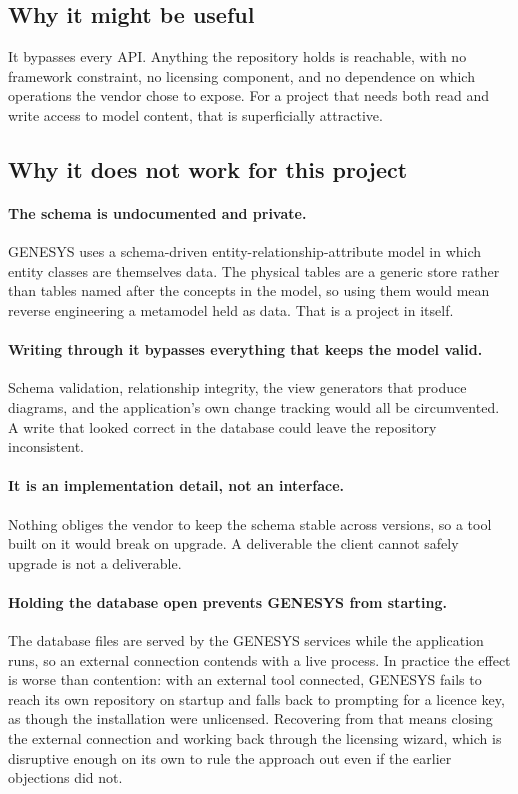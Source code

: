 \subsection{Why it might be useful}

It bypasses every API. Anything the repository holds is reachable, with no
framework constraint, no licensing component, and no dependence on which
operations the vendor chose to expose. For a project that needs both read and
write access to model content, that is superficially attractive.

\subsection{Why it does not work for this project}

\paragraph{The schema is undocumented and private.}
GENESYS uses a schema-driven entity-relationship-attribute model in which entity
classes are themselves data. The physical tables are a generic store rather than
tables named after the concepts in the model, so using them would mean reverse
engineering a metamodel held as data. That is a project in itself.

\paragraph{Writing through it bypasses everything that keeps the model valid.}
Schema validation, relationship integrity, the view generators that produce
diagrams, and the application's own change tracking would all be circumvented. A
write that looked correct in the database could leave the repository
inconsistent.

\paragraph{It is an implementation detail, not an interface.}
Nothing obliges the vendor to keep the schema stable across versions, so a tool
built on it would break on upgrade. A deliverable the client cannot safely
upgrade is not a deliverable.

\paragraph{Holding the database open prevents GENESYS from starting.}
The database files are served by the GENESYS services while the application runs,
so an external connection contends with a live process. In practice the effect is
worse than contention: with an external tool connected, GENESYS fails to reach
its own repository on startup and falls back to prompting for a licence key, as
though the installation were unlicensed. Recovering from that means closing the
external connection and working back through the licensing wizard, which is
disruptive enough on its own to rule the approach out even if the earlier
objections did not.

